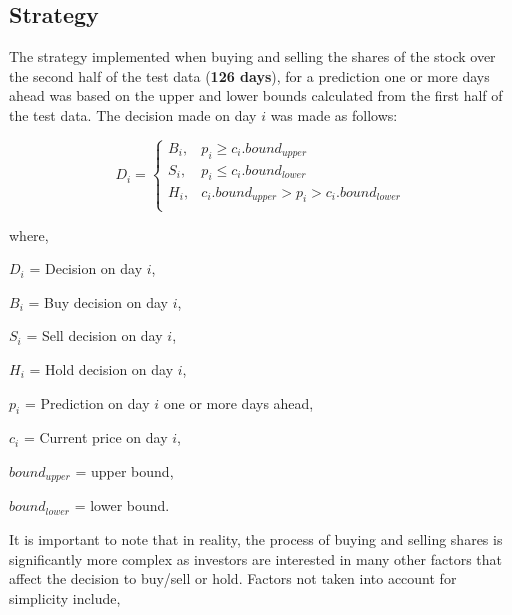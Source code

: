 \subsection{Strategy}
\label{subsection: buy_sell_strat}

The strategy implemented when buying and selling the shares of the stock over the second half of the test data (\textbf{126 days}), for a prediction one or more days ahead was based on the upper and lower bounds calculated from the first half of the test data. The decision made on day $i$ was made as follows:

\begin{equation}\label{eqn: buy_sell}
    D_{i} =
    \begin{cases}
        B_{i}, &  p_{i} \geq c_{i}.bound_{upper} \\
        S_{i}, &  p_{i} \leq c_{i}.bound_{lower} \\
        H_{i}, &  c_{i}.bound_{upper} > p_{i} > c_{i}.bound_{lower} \\
    \end{cases}
\end{equation}

\noindent where, 

$D_{i}$ = Decision on day $i$, 

$B_{i}$ = Buy decision on day $i$, 

$S_{i}$ = Sell decision on day $i$, 

$H_{i}$ = Hold decision on day $i$, 

$p_{i}$ = Prediction on day $i$ one or more days ahead, 

$c_i$ = Current price on day $i$, 

$bound_{upper}$ = upper bound, 

$bound_{lower}$ = lower bound. 

\noindent It is important to note that in reality, the process of buying and selling shares is significantly more complex as investors are interested in many other factors that affect the decision to buy/sell or hold. Factors not taken into account for simplicity include, 

